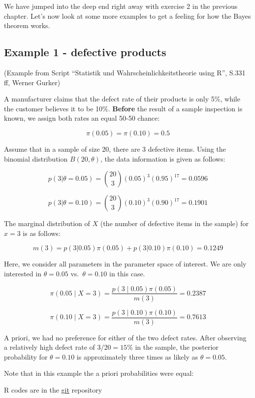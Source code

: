\documentclass[
]{book}
\begin{document}
We have jumped into the deep end right away with exercise 2 in the previous chapter. Let's now look at some more examples to get a feeling for
how the Bayes theorem works.

\subsection{Example 1 - defective products}\label{example_defective_products}

(Example from Script ``Statistik und Wahrscheinlichkeitstheorie using R'',
S.331 ff, Werner Gurker)

A manufacturer claims that the defect rate of their products is only 5\%, while the customer believes it to be 10\%.
\textbf{Before} the result of a sample inspection is known, we assign both rates an equal 50-50 chance:

\[
\pi(0.05) = \pi(0.10) = 0.5
\]

Assume that in a sample of size 20, there are 3 defective items.
Using the binomial distribution \(B(20, \theta)\), the data information is given as follows:

\[
p(3|\theta = 0.05) = \binom{20}{3} (0.05)^3 (0.95)^{17} = 0.0596
\]

\[
p(3|\theta = 0.10) = \binom{20}{3} (0.10)^3 (0.90)^{17} = 0.1901
\]

The marginal distribution of \(X\) (the number of defective items in the sample) for \(x = 3\) is as follows:

\[
m(3) = p(3|0.05)\pi(0.05) + p(3|0.10)\pi(0.10) = 0.1249
\]

Here, we consider all parameters in the parameter space of interest. We are only interested in \(\theta = 0.05\)
vs.~\(\theta = 0.10\) in this case.

\[
\pi(0.05 \mid X = 3) = \frac{p(3 \mid 0.05) \pi(0.05)}{m(3)} = 0.2387
\]

\[
\pi(0.10 \mid X = 3) = \frac{p(3 \mid 0.10) \pi(0.10)}{m(3)} = \mathbf{0.7613}
\]

A priori, we had no preference for either of the two defect rates. After observing a relatively high
defect rate of \(3/20 = 15\%\) in the sample, the posterior probability for \(\theta = 0.10\) is
approximately three times as likely as \(\theta = 0.05\).

Note that in this example the a priori probabilities were equal:

R codes are in the \href{https://github.com/jdegenfellner/Script_QM1_ZHAW/blob/main/04-Bayes_statistics.Rmd}{git} repository
\end{document}
